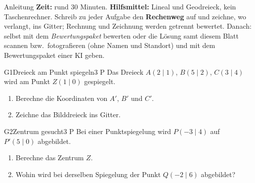 \documentclass[11pt]{article}
\begin{document}

\begin{lpinfo}{Anleitung}
\textbf{Zeit:} rund 30 Minuten. \textbf{Hilfsmittel:} Lineal und Geodreieck, kein Taschenrechner.
Schreib zu jeder Aufgabe den \textbf{Rechenweg} auf und zeichne, wo verlangt, ins Gitter; Rechnung und Zeichnung werden getrennt bewertet.
Danach: selbst mit dem \emph{Bewertungspaket} bewerten oder die Lösung samt diesem Blatt scannen bzw.\ fotografieren
(ohne Namen und Standort) und mit dem Bewertungspaket einer KI geben.
\end{lpinfo}


\begin{lpaufgabe}{G1}{Dreieck am Punkt spiegeln}{3 P}
Das Dreieck $A(2 \mid 1)$, $B(5 \mid 2)$, $C(3 \mid 4)$ wird am Punkt $Z(1 \mid 0)$ gespiegelt.
\begin{enumerate}[label=(\alph*),leftmargin=*,itemsep=3pt]
\item Berechne die Koordinaten von $A'$, $B'$ und $C'$.
\item Zeichne das Bilddreieck ins Gitter.
\end{enumerate}
\begin{center}
\end{center}
\end{lpaufgabe}

\begin{lpaufgabe}{G2}{Zentrum gesucht}{3 P}
Bei einer Punktspiegelung wird $P(-3 \mid 4)$ auf $P'(5 \mid 0)$ abgebildet.
\begin{enumerate}[label=(\alph*),leftmargin=*,itemsep=3pt]
\item Berechne das Zentrum $Z$.
\item Wohin wird bei derselben Spiegelung der Punkt $Q(-2 \mid 6)$ abgebildet?
\end{enumerate}
\end{lpaufgabe}
\end{document}
